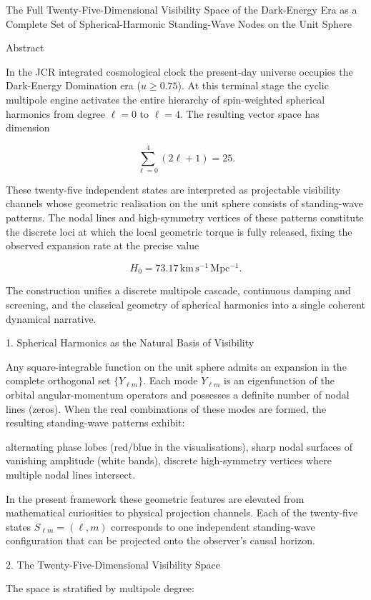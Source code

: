 The Full Twenty-Five-Dimensional Visibility Space of the Dark-Energy Era as a Complete Set of Spherical-Harmonic Standing-Wave Nodes on the Unit Sphere

Abstract

In the JCR integrated cosmological clock the present-day universe occupies the Dark-Energy Domination era (\(u \ge 0.75\)). At this terminal stage the cyclic multipole engine activates the entire hierarchy of spin-weighted spherical harmonics from degree \(\ell = 0\) to \(\ell = 4\). The resulting vector space has dimension

\[
\sum_{\ell=0}^{4}(2\ell+1) = 25.
\]

These twenty-five independent states are interpreted as projectable visibility channels whose geometric realisation on the unit sphere consists of standing-wave patterns. The nodal lines and high-symmetry vertices of these patterns constitute the discrete loci at which the local geometric torque is fully released, fixing the observed expansion rate at the precise value

\[
H_0 = 73.17\,\mathrm{km\,s^{-1}\,Mpc^{-1}}.
\]

The construction unifies a discrete multipole cascade, continuous damping and screening, and the classical geometry of spherical harmonics into a single coherent dynamical narrative.

1. Spherical Harmonics as the Natural Basis of Visibility

Any square-integrable function on the unit sphere admits an expansion in the complete orthogonal set \(\{Y_{\ell m}\}\). Each mode \(Y_{\ell m}\) is an eigenfunction of the orbital angular-momentum operators and possesses a definite number of nodal lines (zeros). When the real combinations of these modes are formed, the resulting standing-wave patterns exhibit:

alternating phase lobes (red/blue in the visualisations),
sharp nodal surfaces of vanishing amplitude (white bands),
discrete high-symmetry vertices where multiple nodal lines intersect.

In the present framework these geometric features are elevated from mathematical curiosities to physical projection channels. Each of the twenty-five states \(S_{\ell m}=(\ell,m)\) corresponds to one independent standing-wave configuration that can be projected onto the observer’s causal horizon.

2. The Twenty-Five-Dimensional Visibility Space

The space is stratified by multipole degree:

